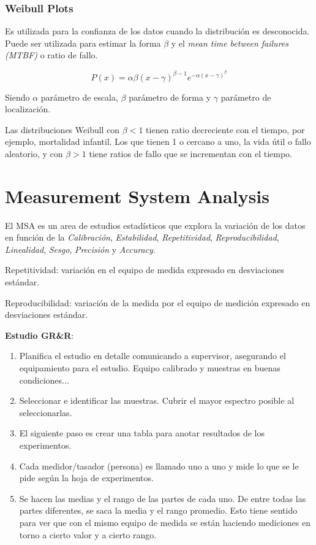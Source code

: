 \documentclass[]{article}
\begin{document}
\subsubsection{Weibull Plots}

Es utilizada para la confianza de los datos cuando la distribución es desconocida. Puede ser utilizada para estimar la forma $\beta$ y el \textit{mean time between failures (MTBF)} o ratio de fallo.

\begin{equation}
P(x) = \alpha \beta (x-\gamma)^{\beta - 1}e^{-\alpha(x-\gamma)^\beta}
\end{equation}

Siendo $\alpha$ parámetro de escala, $\beta$ parámetro de forma y $\gamma$ parámetro de localización.

Las distribuciones Weibull con $\beta < 1$ tienen ratio decreciente con el tiempo, por ejemplo, mortalidad infantil. Los que tienen 1 o cercano a uno, la vida útil o fallo aleatorio, y con $\beta > 1$ tiene ratios de fallo que se incrementan con el tiempo.

\section{Measurement System Analysis}

El MSA es un area de estudios estadísticos que explora la variación de los datos en función de la \textit{Calibración}, \textit{Estabilidad}, \textit{Repetitividad}, \textit{Reproducibilidad}, \textit{Linealidad}, \textit{Sesgo}, \textit{Precisión} y \textit{Accuracy}.

Repetitividad: variación en el equipo de medida expresado en desviaciones estándar. 

Reproducibilidad: variación de la medida por el equipo de medición expresado en desviaciones estándar. 

\textbf{Estudio GR\&R}:
\begin{enumerate}
	\item Planifica el estudio en detalle comunicando a supervisor, asegurando el equipamiento para el estudio. Equipo calibrado y muestras en buenas condiciones... 
	\item Seleccionar e identificar las muestras. Cubrir el mayor espectro posible al seleccionarlas. 
	\item El siguiente paso es crear una tabla para anotar resultados de los experimentos.
	\item Cada medidor/tasador (persona) es llamado uno a uno y mide lo que se le pide según la hoja de experimentos.
	\item Se hacen las medias y el rango de las partes de cada uno. De entre todas las partes diferentes, se saca la media y el rango promedio. Esto tiene sentido para ver que con el mismo equipo de medida se están haciendo mediciones en torno a cierto valor y a cierto rango.
\end{enumerate}
\end{document}
